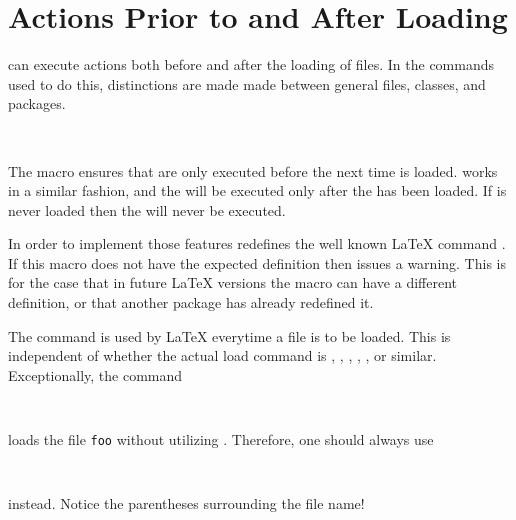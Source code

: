 \section{Actions Prior to and After Loading}
\label{sec:scrlfile.macros}

 can execute actions both before and after the
loading of files. In the commands used to do this, distinctions are
made made between general files, classes, and packages.

\begin{Declaration}
  \\
\end{Declaration}%
%
%
The macro  ensures that  are
only executed before the next time  is loaded.
 works in a similar fashion, and the
 will be executed only after the  has
been loaded.  If  is never loaded then the
 will never be executed.

\begin{Explain}
  In order to implement those features  redefines
  the well known {\LaTeX} command . If this
  macro does not have the expected definition then 
  issues a warning.  This is for the case that in future {\LaTeX}
  versions the macro can have a different definition, or that another
  package has already redefined it.
  
  The command  is used by {\LaTeX} everytime
  a file is to be loaded.  This is independent of whether the actual
  load command is , ,
  , , ,
  or similar. Exceptionally, the command
  \begin{lstlisting}
    
  \end{lstlisting}
  loads the file \texttt{foo} without utilizing
  . Therefore, one should always use
  \begin{lstlisting}
    
  \end{lstlisting}
  instead. Notice the parentheses surrounding the file name!
\end{Explain}
%
%
%

